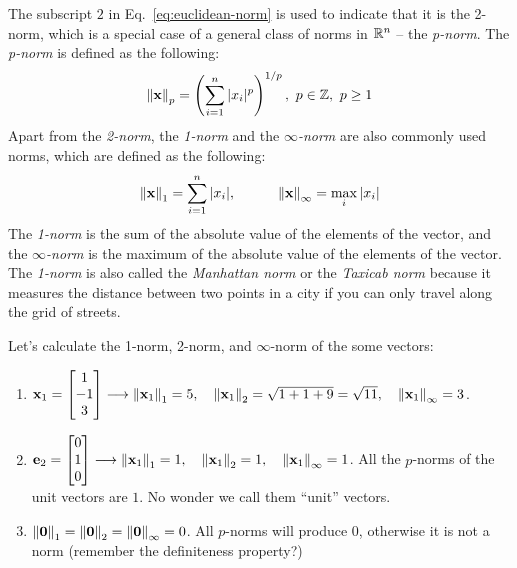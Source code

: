 The subscript $2$ in Eq.~\ref{eq:euclidean-norm} is used to indicate that it is the 2-norm, which is a special case of a general class of norms in $\mathbb{R}^n$ -- the \textit{p-norm}. The \textit{p-norm} is defined as the following:
\begin{equation}
    \norm{\mathbf{x}}_p = \left( \sum_{i=1}^{n} \vert x_i \vert^p \right)^{1/p}, \,\, p \in \mathbb{Z}, \,\, p \geq 1
    \label{eq:p-norm}
\end{equation}
Apart from the \textit{2-norm}, the \textit{1-norm} and the \textit{$\infty$-norm} are also commonly used norms, which are defined as the following:
\begin{equation}
    \norm{\mathbf{x}}_1 = \sum_{i=1}^{n} \vert x_i \vert, \quad \quad \quad \norm{\mathbf{x}}_{\infty} = \max_{i} \vert x_i \vert
    \label{eq:1-infinity-norm}
\end{equation}
The \textit{1-norm} is the sum of the absolute value of the elements of the vector, and the \textit{$\infty$-norm} is the maximum of the absolute value of the elements of the vector. The \textit{1-norm} is also called the \textit{Manhattan norm} or the \textit{Taxicab norm} because it measures the distance between two points in a city if you can only travel along the grid of streets.

\begin{boxedstuff}
    \begin{example}
        Let's calculate the 1-norm, 2-norm, and $\infty$-norm of the some vectors: %

        \begin{enumerate}
            \item $\mf{x}_1 = \bmxc 1 \\ -1 \\ 3 \emx \longrightarrow \lV \mf{x}_1 \rV_1 = 5, \quad \lV \mf{x}_1 \rV_2 = \sqrt{1 + 1 + 9} = \sqrt{11}, \quad \lV \mf{x}_1 \rV_{\infty} = 3$.
            \item $\mf{e}_2 = \bmxc 0 \\ 1 \\ 0 \emx \longrightarrow \lV \mf{x}_1 \rV_1 = 1, \quad \lV \mf{x}_1 \rV_2 = 1, \quad \lV \mf{x}_1 \rV_{\infty} = 1$. All the $p$-norms of the unit vectors are $1$. No wonder we call them ``unit'' vectors.
            \item $\left\lVert \mathbf{0} \right\rVert_1 = \left\lVert \mathbf{0} \right\rVert_2 = \left\lVert \mathbf{0} \right\rVert_{\infty} = 0$. All $p$-norms will produce 0, otherwise it is not a norm (remember the definiteness property?)
        \end{enumerate}
    \end{example}
\end{boxedstuff}

